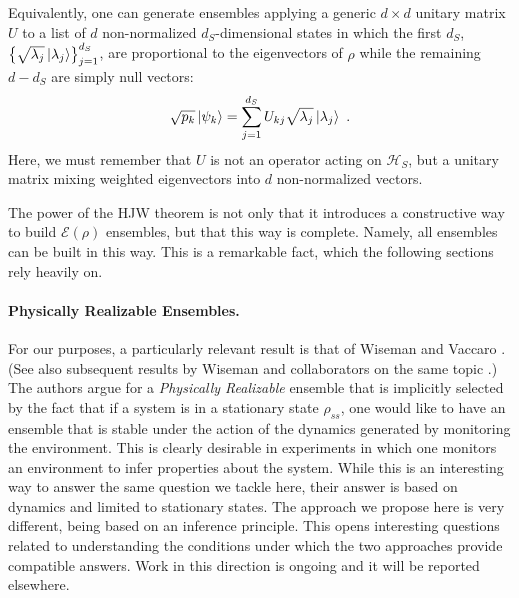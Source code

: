 \documentclass[draft,nofootinbib,pre,twocolumn,showpacs,showkeys,groupaddress,preprintnumbers,floatfix]{revtex4-1}
\newcommand{\1}{\mathbbm{1}}
\begin{document}
Equivalently, one can generate ensembles applying a generic $d \times d$ unitary matrix 
$U$ to a list of $d$ non-normalized $d_S$-dimensional states in which the first 
$d_S$, $\left\{\sqrt{\lambda_j}\ket{\lambda_j}\right\}_{j=1}^{d_S}$, are proportional to the eigenvectors 
of $\rho$ while the remaining $d - d_S$ are simply null vectors: 
\begin{align*}
\sqrt{p_k}\ket{\psi_k}
  = \sum_{j=1}^{d_S} U_{kj}\sqrt{\lambda_j}\ket{\lambda_j}
  ~.
\end{align*}
Here, we must remember that $U$ is not an operator acting on $\mathcal{H}_S$,
but a unitary matrix mixing weighted eigenvectors into $d$ non-normalized
vectors.

The power of the HJW theorem is not only that it introduces a constructive way
to build $\mathcal{E}(\rho)$ ensembles, but that this way is complete. Namely,
all ensembles can be built in this way. This is a remarkable fact, which the
following sections rely heavily on.

\paragraph*{Physically Realizable Ensembles.} For our purposes, a particularly
relevant result is that of Wiseman and Vaccaro \cite{Wise01}. (See also
subsequent results by Wiseman and collaborators on the same topic
\cite{Kar11}.) The authors argue for a \emph{Physically Realizable} ensemble
that is implicitly selected by the fact that if a system is in a stationary
state $\rho_{ss}$, one would like to have an ensemble that is stable under the
action of the dynamics generated by monitoring the environment. This is clearly
desirable in experiments in which one monitors an environment to infer
properties about the system. While this is an interesting way to answer the
same question we tackle here, their answer is based on dynamics and limited to
stationary states. The approach we propose here is very different, being based
on an inference principle. This opens interesting questions related to
understanding the conditions under which the two approaches provide compatible
answers. Work in this direction is ongoing and it will be reported elsewhere.
\end{document}
